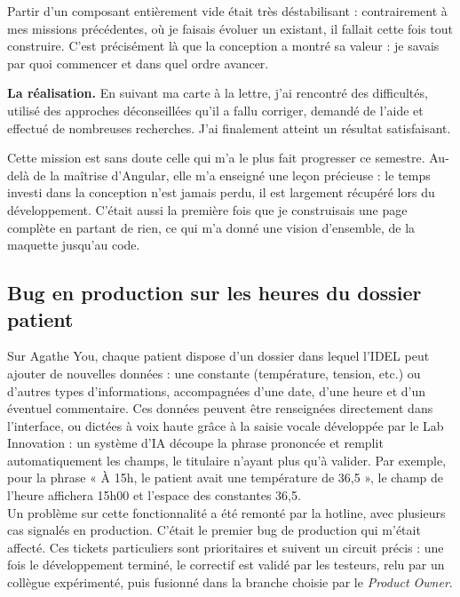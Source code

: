 \documentclass{article}
\begin{document}

Partir d'un composant entièrement vide était très déstabilisant : contrairement à mes missions précédentes, où je faisais évoluer un existant, il fallait cette fois tout construire. C'est précisément là que la conception a montré sa valeur : je savais par quoi commencer et dans quel ordre avancer.

\textbf{La réalisation.} En suivant ma carte à la lettre, j'ai rencontré des difficultés, utilisé des approches déconseillées qu'il a fallu corriger, demandé de l'aide et effectué de nombreuses recherches. J'ai finalement atteint un résultat satisfaisant.


Cette mission est sans doute celle qui m'a le plus fait progresser ce semestre. Au-delà de la maîtrise d'Angular, elle m'a enseigné une leçon précieuse : le temps investi dans la conception n'est jamais perdu, il est largement récupéré lors du développement. C'était aussi la première fois que je construisais une page complète en partant de rien, ce qui m'a donné une vision d'ensemble, de la maquette jusqu'au code.

\subsection{Bug en production sur les heures du dossier patient}

Sur Agathe You, chaque patient dispose d'un dossier dans lequel l'IDEL peut ajouter de nouvelles données : une constante (température, tension, etc.) ou d'autres types d'informations, accompagnées d'une date, d'une heure et d'un éventuel commentaire. Ces données peuvent être renseignées directement dans l'interface, ou dictées à voix haute grâce à la saisie vocale développée par le Lab Innovation : un système d'IA découpe la phrase prononcée et remplit automatiquement les champs, le titulaire n'ayant plus qu'à valider. Par exemple, pour la phrase « À 15h, le patient avait une température de 36,5 », le champ de l'heure affichera 15h00 et l'espace des constantes 36,5.\\

Un problème sur cette fonctionnalité a été remonté par la hotline, avec plusieurs cas signalés en production. C'était le premier bug de production qui m'était affecté. Ces tickets particuliers sont prioritaires et suivent un circuit précis : une fois le développement terminé, le correctif est validé par les testeurs, relu par un collègue expérimenté, puis fusionné dans la branche choisie par le \textit{Product Owner}.\\
\end{document}
